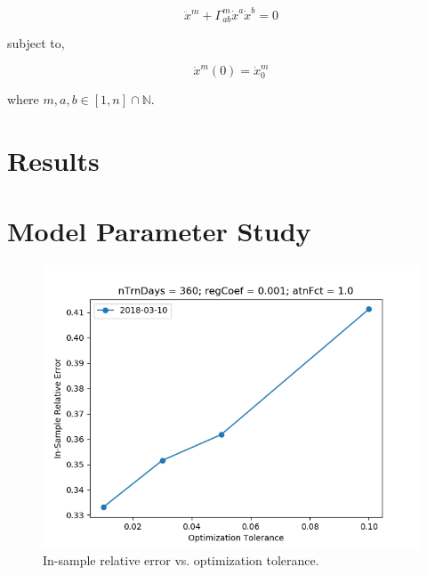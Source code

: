 \documentclass{article}
\begin{document}
\begin{equation}\label{eqn:geodesic}
\ddot{x}^{m} + \Gamma^{m}_{ab} \dot{x}^{a} \dot{x}^{b} = 0
\end{equation}

subject to,

\begin{equation}\label{eqn:geodesic-bc}
\dot{x}^{m}(0) = \dot{x}^{m}_{0}
\end{equation}

where $m,a,b \in [1,n] \cap \mathbb{N}$.

\section{Results}\label{section:results}

\section{Model Parameter Study}\label{section:model-parameter-study}

\begin{figure}\label{fig:tolerance-sensitivity-error}
\includegraphics[width = \textwidth]{figures/tolerance-sensitivity-error.png}
\caption{In-sample relative error vs. optimization tolerance.}
\end{figure}
\end{document}
